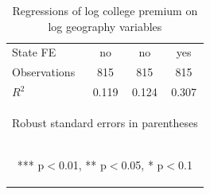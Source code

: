\documentclass[12 pt]{article}
\begin{document}
\begin{table}
\begin{tabular}{lccc}
    State FE & \mbox{no} & \mbox{no} & \mbox{yes} \\
    Observations & 815 & 815 & 815 \\
     $R^2$ & 0.119 & 0.124 & 0.307 \\ \hline
    \multicolumn{4}{c}{\begin{footnotesize} Robust standard errors in parentheses\end{footnotesize}} \\
    \multicolumn{4}{c}{\begin{footnotesize} *** p$<$0.01, ** p$<$0.05, * p$<$0.1\end{footnotesize}} \\
    \end{tabular}
    \caption{Regressions of log college premium on log geography variables}
    \label{tab:skill_reg}
\end{table}
\end{document}
